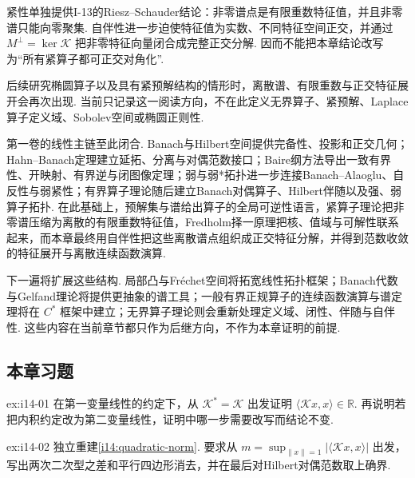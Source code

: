 \begin{FARemark}[紧性与自伴性的分工]
紧性单独提供I-13的Riesz--Schauder结论：非零谱点是有限重数特征值，并且非零谱只能向零聚集. 自伴性进一步迫使特征值为实数、不同特征空间正交，并通过 \(\displaystyle M^\perp=\ker\mathcal K\) 把非零特征向量闭合成完整正交分解. 因而不能把本章结论改写为“所有紧算子都可正交对角化”.
\end{FARemark}

\begin{FARemark}[偏微分方程预告]
后续研究椭圆算子以及具有紧预解结构的情形时，离散谱、有限重数与正交特征展开会再次出现. 当前只记录这一阅读方向，不在此定义无界算子、紧预解、Laplace算子定义域、Sobolev空间或椭圆正则性.
\end{FARemark}

第一卷的线性主链至此闭合. Banach与Hilbert空间提供完备性、投影和正交几何；Hahn--Banach定理建立延拓、分离与对偶范数接口；Baire纲方法导出一致有界性、开映射、有界逆与闭图像定理；弱与弱*拓扑进一步连接Banach--Alaoglu、自反性与弱紧性；有界算子理论随后建立Banach对偶算子、Hilbert伴随以及强、弱算子拓扑. 在此基础上，预解集与谱给出算子的全局可逆性语言，紧算子理论把非零谱压缩为离散的有限重数特征值，Fredholm择一原理把核、值域与可解性联系起来，而本章最终用自伴性把这些离散谱点组织成正交特征分解，并得到范数收敛的特征展开与离散连续函数演算.

下一遍将扩展这些结构. 局部凸与Fréchet空间将拓宽线性拓扑框架；Banach代数与Gelfand理论将提供更抽象的谱工具；一般有界正规算子的连续函数演算与谱定理将在 \(\displaystyle C^*\) 框架中建立；无界算子理论则会重新处理定义域、闭性、伴随与自伴性. 这些内容在当前章节都只作为后继方向，不作为本章证明的前提.

\subsection*{本章习题}

\begin{FAExercise}[自伴二次型的实性]{ex:i14-01}
在第一变量线性的约定下，从 \(\displaystyle \mathcal K^*=\mathcal K\) 出发证明 \(\displaystyle \langle\mathcal Kx,x\rangle\in\mathbb R\). 再说明若把内积约定改为第二变量线性，证明中哪一步需要改写而结论不变.
\end{FAExercise}

\begin{FAExercise}[二次型范数公式]{ex:i14-02}
独立重建\autoref{i14:quadratic-norm}. 要求从 \(\displaystyle m=\sup_{\|x\|=1}|\langle\mathcal Kx,x\rangle|\) 出发，写出两次二次型之差和平行四边形消去，并在最后对Hilbert对偶范数取上确界.
\end{FAExercise}


